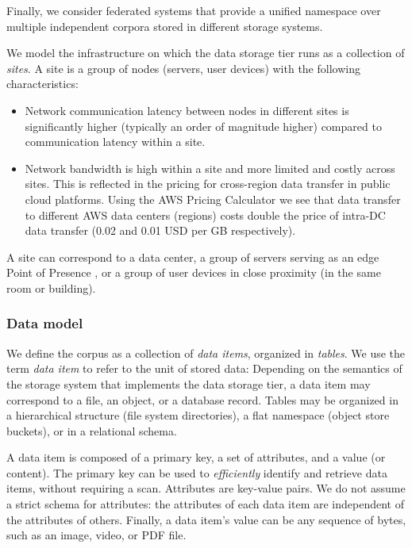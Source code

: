 Finally, we consider federated systems that provide a unified namespace over multiple independent corpora stored in different storage systems.

We model the infrastructure on which the data storage tier runs as a collection of \textit{sites}.
A site is a group of nodes (servers, user devices) with the following characteristics:
\begin{itemize}
  \item Network communication latency between nodes in different sites is significantly higher (typically an order of
  magnitude higher) \cite{pbailis:hats} compared to communication latency within a site.
  \item Network bandwidth is high within a site and more limited and costly across sites.
  This is reflected in the pricing for cross-region data transfer in public cloud platforms.
  Using the AWS Pricing Calculator \cite{aws:costcalc} we see that data transfer to different AWS data centers
  (regions) costs double the price of intra-DC data transfer (0.02 and 0.01 USD per GB respectively).
\end{itemize}

A site can correspond to a data center, a group of servers serving as an edge Point of Presence \cite{google:infra}, or
a group of user devices in close proximity (in the same room or building).

\subsubsection{Data model}
We define the corpus as a collection of \textit{data items}, organized in \textit{tables}.
We use the term \textit{data item} to refer to the unit of stored data:
Depending on the semantics of the storage system that implements the data storage tier,
a data item may correspond to a file, an object, or a database record.
Tables may be organized in a hierarchical structure (file system directories), a flat namespace (object store buckets),
or in a relational schema.

A data item is composed of a primary key, a set of attributes, and a value (or content).
The primary key can be used to \textit{efficiently} identify and retrieve data items, without requiring a scan.
Attributes are key-value pairs.
We do not assume a strict schema for attributes: the attributes of each data item are independent of the attributes of
others.
Finally, a data item's value can be any sequence of bytes, such as an image, video, or PDF file.

